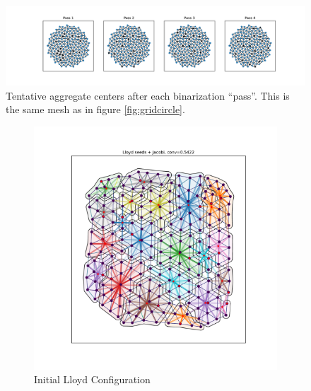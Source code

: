 \documentclass{article}
\begin{document}
\begin{figure}[h]
  \centering
  \includegraphics[width=\textwidth, trim=120 0 100 0, clip]{grid_circle_agg_pass.pdf}
  \caption{Tentative aggregate centers after each binarization ``pass''.  This is the same mesh as in figure \ref{fig:gridcircle}.}
\end{figure}

\begin{figure}[h]
  \centering
  \begin{subfigure}[t]{0.32\textwidth}
    \centering
    \includegraphics[width=\textwidth, trim=80 70 70 50, clip]{grid_700_dumb.pdf}
    \caption{Initial Lloyd Configuration}
  \end{subfigure}
  \begin{subfigure}[t]{0.32\textwidth}
    \centering

\end{subfigure}
\end{figure}
\end{document}
